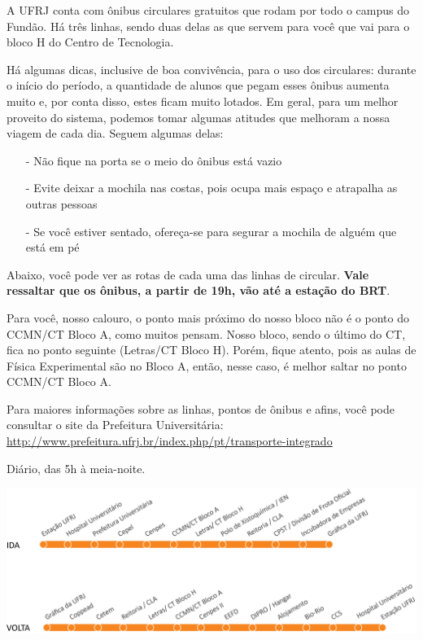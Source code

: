     A UFRJ conta com ônibus circulares gratuitos que rodam por todo o campus do Fundão. Há três linhas, sendo duas delas as que servem para você que vai para o bloco H do Centro de Tecnologia.
    
    Há algumas dicas, inclusive de boa convivência, para o uso dos circulares: durante o início do período, a quantidade de alunos que pegam esses ônibus aumenta muito e, por conta disso, estes ficam muito lotados. Em geral, para um melhor proveito do sistema, podemos tomar algumas atitudes que melhoram a nossa viagem de cada dia. Seguem algumas delas:
    \begin{itemize}
    	\item[-] Não fique na porta se o meio do ônibus está vazio
        \item[-] Evite deixar a mochila nas costas, pois ocupa mais espaço e atrapalha as outras pessoas
        \item[-] Se você estiver sentado, ofereça-se para segurar a mochila de alguém que está em pé
    \end{itemize}
    
    Abaixo, você pode ver as rotas de cada uma das linhas de circular. \textbf{Vale ressaltar que os ônibus, a partir de 19h, vão até a estação do BRT}.
    
    Para você, nosso calouro, o ponto mais próximo do nosso bloco não é o ponto do CCMN/CT Bloco A, como muitos pensam. Nosso bloco, sendo o último do CT, fica no ponto seguinte (Letras/CT Bloco H). Porém, fique atento, pois as aulas de Física Experimental são no Bloco A, então, nesse caso, é melhor saltar no ponto CCMN/CT Bloco A.
    
    Para maiores informações sobre as linhas, pontos de ônibus e afins, você pode consultar o site da Prefeitura Universitária: \href{http://www.prefeitura.ufrj.br/index.php/pt/transporte-integrado}{http://www.prefeitura.ufrj.br/index.php/pt/transporte-integrado}

       
        
        Diário, das 5h à meia-noite.
        
        \begin{center}
          \includegraphics[width=\textwidth]{assets/esquematico_circular1_ufrj.png}
    	\end{center}               
		      
